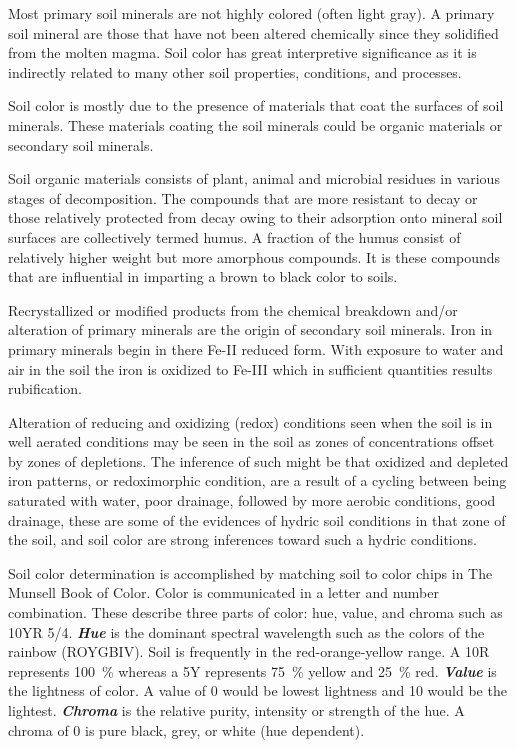 \documentclass{book}
\begin{document}
Most primary soil minerals are not highly colored (often light gray). A primary soil mineral are those that have not been altered chemically since they solidified from the molten magma. Soil color has great interpretive significance as it is indirectly related to many other soil properties, conditions, and processes.

Soil color is mostly due to the presence of materials that coat the surfaces of soil minerals. These materials coating the soil minerals could be organic materials or secondary soil minerals.

Soil organic materials consists of plant, animal and microbial residues in various stages of decomposition. The compounds that are more resistant to decay or those relatively protected from decay owing to their adsorption onto mineral soil surfaces are  collectively termed humus. A fraction of the humus consist of relatively higher weight but more amorphous compounds. It is these compounds that are influential in imparting a brown to black color to soils.

Recrystallized or modified products from the chemical breakdown and/or alteration of primary minerals are the origin of secondary soil minerals. Iron in primary minerals begin in there Fe-II reduced form. With exposure to water and air in the soil the iron is oxidized to Fe-III which in sufficient quantities results rubification.
 
Alteration of reducing and oxidizing (redox) conditions seen when the soil is in well aerated conditions may be seen in the soil as zones of concentrations offset by zones of depletions. The inference of such might be that oxidized and depleted iron patterns, or redoximorphic condition, are a result of a cycling between being saturated with water, poor drainage, followed by more aerobic conditions, good drainage, these are some of the evidences of hydric soil conditions in that zone of the soil, and soil color are strong inferences toward such a hydric conditions.
    
Soil color determination is accomplished by matching soil to color chips in The Munsell Book of Color. Color is communicated in a letter and number combination. These describe three parts of color: hue, value, and chroma such as 10YR 5/4. \textbf{\textit{Hue}} is the dominant spectral wavelength such as the colors of the rainbow (ROYGBIV). Soil is frequently in the red-orange-yellow range.  A 10R represents \qty{100}{\percent} whereas a 5Y represents \qty{75}{\percent} yellow and \qty{25}{\percent} red. \textbf{\textit{Value}} is the lightness of color. A value of 0 would be lowest lightness and 10 would be the lightest. \textbf{\textit{Chroma}} is the relative purity, intensity or strength of the hue. A chroma of 0 is pure black, grey, or white (hue dependent).
\end{document}
